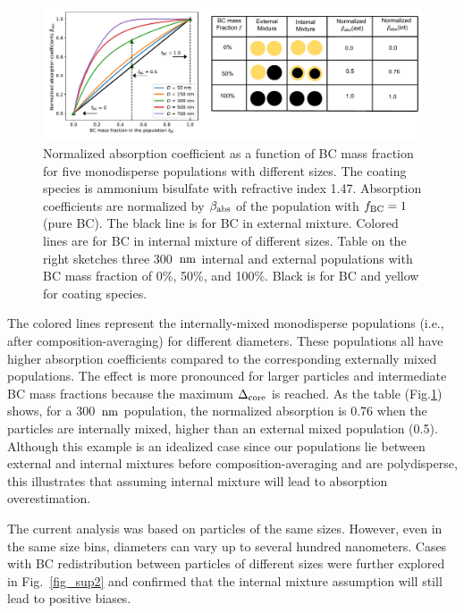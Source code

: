 \documentclass[edeposit,fullpage]{uiucthesis2009}
\makeatletter
\DeclareRobustCommand*\unit[1]
 {\ensuremath{%
   {\thinmuskip3mu\relax
    \def\mu{\text{\textmu}}\def~{\,}%
    \ifx\f@series\testbx\mathbf{#1}\else\mathrm{#1}\fi}}}
\makeatother
\begin{document}
\begin{figure}
	\centering
	\includegraphics[scale=0.5]{chap4_figs/fig5.pdf}
	\caption{Normalized absorption coefficient as a function of BC
          mass fraction for five monodisperse populations with
          different sizes. The coating species is ammonium bisulfate
          with refractive index 1.47. Absorption coefficients are
          normalized by $\beta_{\rm abs}$ of the population with
          $f_{\rm BC} = 1$ (pure BC). The black line is for BC in
          external mixture. Colored lines are for BC in internal
          mixture of different sizes. Table on the right sketches
          three 300~\unit{nm} internal and external populations with
          BC mass fraction of 0\%, 50\%, and 100\%. Black is for BC
          and yellow for coating species.}
	\label{fig5:abs-exp}
\end{figure}

The colored lines represent the internally-mixed monodisperse
populations (i.e., after composition-averaging) for different
diameters. These populations all have higher absorption coefficients
compared to the corresponding externally mixed populations. The effect
is more pronounced for larger particles and intermediate BC mass
fractions because the maximum $\Delta_{\rm core}$ is reached. As the
table (Fig.\ref{fig5:abs-exp}) shows, for a 300~\unit{nm} population,
the normalized absorption is 0.76 when the particles are internally
mixed, higher than an external mixed population (0.5). Although this
example is an idealized case since our populations lie between
external and internal mixtures before composition-averaging and are
polydisperse, this illustrates that assuming internal mixture will
lead to absorption overestimation.

The current analysis was based on particles of the same sizes. However,
even in the same size bins, diameters can vary up to several hundred
nanometers. Cases with BC redistribution between particles of
different sizes were further explored in Fig.~\ref{fig_sup2} and
confirmed that the internal mixture assumption will still lead to
positive biases.
\end{document}
